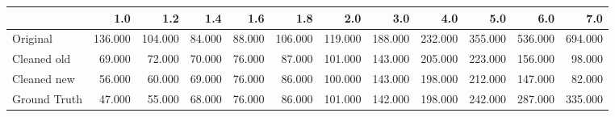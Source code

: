 \begin{tabular}{lrrrrrrrrrrr}
\toprule
{} &     1.0 &     1.2 &    1.4 &    1.6 &     1.8 &     2.0 &     3.0 &     4.0 &     5.0 &     6.0 &     7.0 \\
\midrule
Original     & 136.000 & 104.000 & 84.000 & 88.000 & 106.000 & 119.000 & 188.000 & 232.000 & 355.000 & 536.000 & 694.000 \\
Cleaned old  &  69.000 &  72.000 & 70.000 & 76.000 &  87.000 & 101.000 & 143.000 & 205.000 & 223.000 & 156.000 &  98.000 \\
Cleaned new  &  56.000 &  60.000 & 69.000 & 76.000 &  86.000 & 100.000 & 143.000 & 198.000 & 212.000 & 147.000 &  82.000 \\
Ground Truth &  47.000 &  55.000 & 68.000 & 76.000 &  86.000 & 101.000 & 142.000 & 198.000 & 242.000 & 287.000 & 335.000 \\
\bottomrule
\end{tabular}
